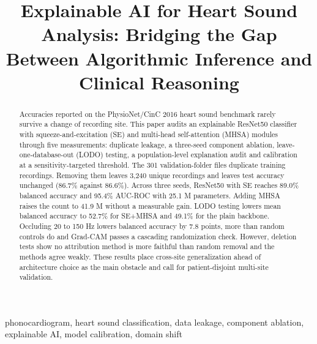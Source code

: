 \documentclass[conference]{IEEEtran}
\begin{document}
\title{Explainable AI for Heart Sound Analysis: Bridging the Gap Between Algorithmic Inference and Clinical Reasoning}

\author{
\and
{}
}

\maketitle

\begin{abstract}
Accuracies reported on the PhysioNet/CinC 2016 heart sound benchmark rarely survive a change of recording site. This paper audits an explainable ResNet50 classifier with squeeze-and-excitation (SE) and multi-head self-attention (MHSA) modules through five measurements: duplicate leakage, a three-seed component ablation, leave-one-database-out (LODO) testing, a population-level explanation audit and calibration at a sensitivity-targeted threshold. The 301 validation-folder files duplicate training recordings. Removing them leaves 3,240 unique recordings and leaves test accuracy unchanged (86.7\% against 86.6\%). Across three seeds, ResNet50 with SE reaches 89.0\% balanced accuracy and 95.4\% AUC-ROC with 25.1 M parameters. Adding MHSA raises the count to 41.9 M without a measurable gain. LODO testing lowers mean balanced accuracy to 52.7\% for SE+MHSA and 49.1\% for the plain backbone. Occluding 20 to 150 Hz lowers balanced accuracy by 7.8 points, more than random controls do and Grad-CAM passes a cascading randomization check. However, deletion tests show no attribution method is more faithful than random removal and the methods agree weakly. These results place cross-site generalization ahead of architecture choice as the main obstacle and call for patient-disjoint multi-site validation.
\end{abstract}

\begin{IEEEkeywords}
phonocardiogram, heart sound classification, data leakage, component ablation, explainable AI, model calibration, domain shift
\end{IEEEkeywords}
\end{document}
